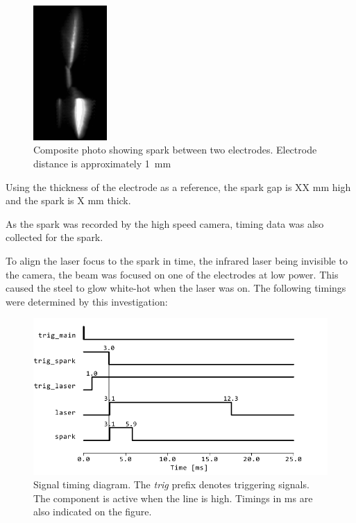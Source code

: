             \begin{figure}[!ht]
                \centering
                \includegraphics[width=0.25\textwidth]{assets/4 experiments/Composite photo spark.png}
                \caption{Composite photo showing spark between two electrodes. Electrode distance is approximately \qty{1}{mm}}
            \end{figure}
            
            Using the thickness of the electrode as a reference, the spark gap is XX mm high and the spark is X mm thick. 
            
            As the spark was recorded by the high speed camera, timing data was also collected for the spark.
            
            To align the laser focus to the spark in time, the infrared laser being invisible to the camera, the beam was focused on one of the electrodes at low power. This caused the steel to glow white-hot when the laser was on. The following timings were determined by this investigation: 

            \begin{figure}
                \centering
                \includegraphics[width=\textwidth]{assets/4 experiments/timings.pdf}
                \caption{Signal timing diagram. The \textit{trig} prefix denotes triggering signals. The component is active when the line is high. Timings in \unit{ms} are also indicated on the figure.}
            \end{figure}

